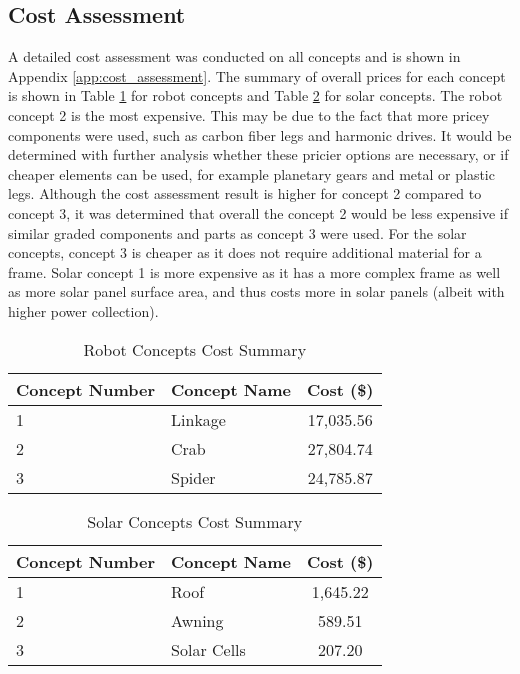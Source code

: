 \subsection{Cost Assessment}

A detailed cost assessment was conducted on all concepts and is shown in Appendix \ref{app:cost_assessment}. The summary of overall prices for each concept is shown in Table \ref{table:concept_cost_summary} for robot concepts and Table \ref{table:solar_concept_cost_summary} for solar concepts. The robot concept 2 is the most expensive. This may be due to the fact that more pricey components were used, such as carbon fiber legs and harmonic drives. It would be determined with further analysis whether these pricier options are necessary, or if cheaper elements can be used, for example planetary gears and metal or plastic legs. Although the cost assessment result is higher for concept 2 compared to concept 3, it was determined that overall the concept 2 would be less expensive if similar graded components and parts as concept 3 were used.
For the solar concepts, concept 3 is cheaper as it does not require additional material for a frame. Solar concept 1 is more expensive as it has a more complex frame as well as more solar panel surface area, and thus costs more in solar panels (albeit with higher power collection).

\begin{table}[H]
    \centering
    \caption{Robot Concepts Cost Summary}
    \label{table:concept_cost_summary}
    \begin{tabular}{| l |  l | c |}
        \hline
        Concept Number & Concept Name & Cost (\$)
        \\ \hline
        1 & Linkage & 17,035.56
        \\ \hline
        2 & Crab & 27,804.74
        \\ \hline
        3 & Spider & 24,785.87
         \\ \hline
    \end{tabular}
\end{table}

\begin{table}[H]
\centering
    \caption{Solar Concepts Cost Summary}
    \label{table:solar_concept_cost_summary}
    \begin{tabular}{| l |  l | c |}
        \hline
        Concept Number & Concept Name & Cost (\$)
        \\ \hline
        1 & Roof & 1,645.22
        \\ \hline
        2 & Awning & 589.51
        \\ \hline
        3 & Solar Cells & 207.20
         \\ \hline
    \end{tabular}
\end{table}